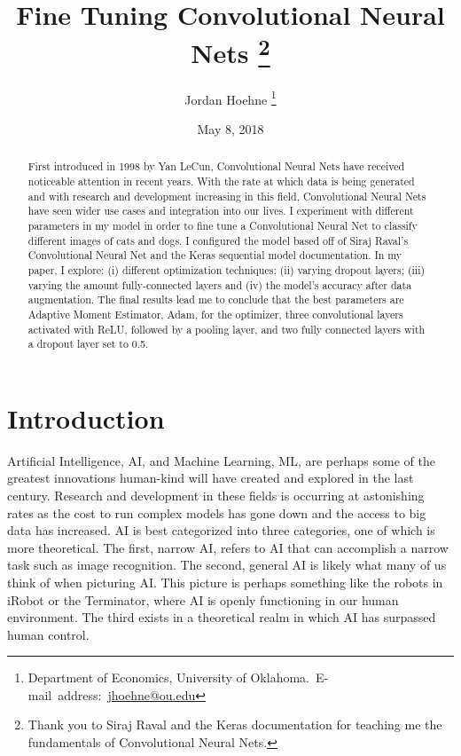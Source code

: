 \documentclass[12pt,english]{article}
\begin{document}
\begin{singlespace}
\title{Fine Tuning Convolutional Neural Nets
\thanks{Thank you to Siraj Raval and the Keras documentation for teaching me the fundamentals of Convolutional Neural Nets.}}
\end{singlespace}

\author{Jordan Hoehne
\thanks{Department of Economics, University of Oklahoma.\
E-mail~address:~\href{mailto:jhoehne@ou.edu}{jhoehne@ou.edu}}}

\date{May 8, 2018}

\maketitle
\begin{abstract}
\begin{singlespace}
First introduced in 1998 by Yan LeCun, Convolutional Neural Nets have received noticeable attention in recent years. With the rate at which data is being generated and with research and development increasing in this field, Convolutional Neural Nets have seen wider use cases and integration into our lives. I experiment with different parameters in my model in order to fine tune a Convolutional Neural Net to classify different images of cats and dogs. I configured the model based off of Siraj Raval's Convolutional Neural Net and the Keras sequential model documentation. In my paper, I explore: (i) different optimization techniques; (ii) varying dropout layers; (iii) varying the amount fully-connected layers and (iv) the model’s accuracy after data augmentation. The final results lead me to conclude that the best parameters are Adaptive Moment Estimator, Adam, for the optimizer, three convolutional layers activated with ReLU, followed by a pooling layer, and two fully connected layers with a dropout layer set to 0.5.
\end{singlespace}
\end{abstract}
\vfill{}

\pagebreak{}

\section{Introduction} 
Artificial Intelligence, AI, and Machine Learning, ML, are perhaps some of the greatest innovations human-kind will have created and explored in the last century. Research and development in these fields is occurring at astonishing rates as the cost to run complex models has gone down and the access to big data has increased. AI is best categorized into three categories, one of which is more theoretical. The first, narrow AI, refers to AI that can accomplish a narrow task such as image recognition. The second, general AI is likely what many of us think of when picturing AI. This picture is perhaps something like the robots in iRobot or the Terminator, where AI is openly functioning in our human environment. The third exists in a theoretical realm in which AI has surpassed human control. \par
\end{document}
